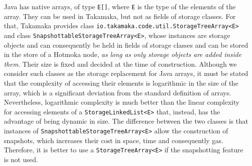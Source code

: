 Java has native arrays, of type \texttt{E[]}, where \texttt{E} is the
type of the elements of the array. They can be used in Takamaka, but not
as fields of storage classes. For that, Takamaka provides class
\texttt{io.takamaka.code.util.StorageTreeArray<E>}
and class
\texttt{SnapshottableStorageTreeArray<E>},
whose instances are storage objects and
can consequently be held in fields of storage classes and
can be stored in the store of a Hotmoka node, \emph{as long as only
storage objects are added inside them}. Their size is fixed and decided
at the time of construction. Although we consider such classes
as the storage replacement for Java arrays, it must be stated that the complexity of
accessing their elements is logarithmic in the size of the array, which is
a significant deviation from the standard definition of arrays. Nevertheless,
logarithmic complexity is much better than the linear complexity for
accessing elements of a \texttt{StorageLinkedList<E>} that, instead, has the advantage
of being dynamic in size. The difference between the two classes
is that instances of \texttt{SnapshottableStorageTreeArray<E>} allow the construction
of snapshots, which increases their cost in space, time and consequently gas.
Therefore, it is better to use a \texttt{StorageTreeArray<E>} if the
snapshotting feature is not used.

